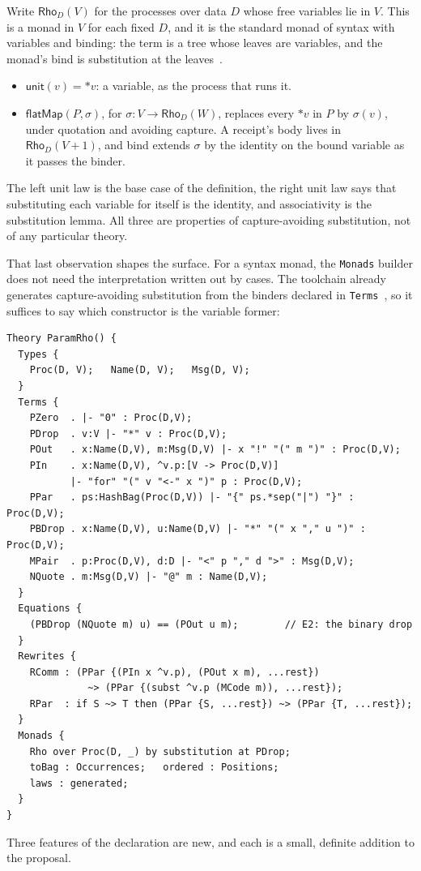 \documentclass[11pt]{article}
\theoremstyle{branddef}
\theoremstyle{brandplain}
\theoremstyle{brandrem}
\newcommand{\unit}{\mathsf{unit}}
\newcommand{\bind}{\mathsf{flatMap}}
\begin{document}
Write \(\mathsf{Rho}_D(V)\) for the processes over data \(D\) whose free
variables lie in \(V\). This is a monad in \(V\) for each fixed \(D\), and it is
the standard monad of syntax with variables and binding: the term is a tree
whose leaves are variables, and the monad's bind is substitution at the
leaves~\cite{BirdPaterson99, AltenkirchReus99, FiorePlotkinTuri99}.
\begin{itemize}[nosep]
\item \(\unit(v) = \ast v\): a variable, as the process that runs it.
\item \(\bind(P, \sigma)\), for \(\sigma : V \to \mathsf{Rho}_D(W)\), replaces
every \(\ast v\) in \(P\) by \(\sigma(v)\), under quotation and avoiding
capture. A receipt's body lives in \(\mathsf{Rho}_D(V+1)\), and bind extends
\(\sigma\) by the identity on the bound variable as it passes the binder.
\end{itemize}
The left unit law is the base case of the definition, the right unit law says
that substituting each variable for itself is the identity, and associativity is
the substitution lemma. All three are properties of capture-avoiding
substitution, not of any particular theory.

That last observation shapes the surface. For a syntax monad, the
\texttt{Monads} builder does not need the interpretation written out by cases.
The toolchain already generates capture-avoiding substitution from the binders
declared in \texttt{Terms}~\cite{F1R3Dev}, so it suffices to say which
constructor is the variable former:
\begin{lstlisting}[language=mettail]
Theory ParamRho() {
  Types {
    Proc(D, V);   Name(D, V);   Msg(D, V);
  }
  Terms {
    PZero  . |- "0" : Proc(D,V);
    PDrop  . v:V |- "*" v : Proc(D,V);
    POut   . x:Name(D,V), m:Msg(D,V) |- x "!" "(" m ")" : Proc(D,V);
    PIn    . x:Name(D,V), ^v.p:[V -> Proc(D,V)]
           |- "for" "(" v "<-" x ")" p : Proc(D,V);
    PPar   . ps:HashBag(Proc(D,V)) |- "{" ps.*sep("|") "}" : Proc(D,V);
    PBDrop . x:Name(D,V), u:Name(D,V) |- "*" "(" x "," u ")" : Proc(D,V);
    MPair  . p:Proc(D,V), d:D |- "<" p "," d ">" : Msg(D,V);
    NQuote . m:Msg(D,V) |- "@" m : Name(D,V);
  }
  Equations {
    (PBDrop (NQuote m) u) == (POut u m);        // E2: the binary drop
  }
  Rewrites {
    RComm : (PPar {(PIn x ^v.p), (POut x m), ...rest})
              ~> (PPar {(subst ^v.p (MCode m)), ...rest});
    RPar  : if S ~> T then (PPar {S, ...rest}) ~> (PPar {T, ...rest});
  }
  Monads {
    Rho over Proc(D, _) by substitution at PDrop;
    toBag : Occurrences;   ordered : Positions;
    laws : generated;
  }
}
\end{lstlisting}
Three features of the declaration are new, and each is a small, definite
addition to the proposal.
\end{document}
